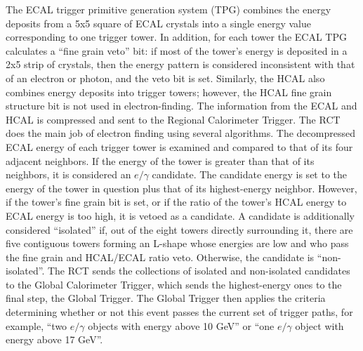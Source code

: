 The ECAL trigger primitive generation system (TPG) combines the energy deposits 
from a 5x5 square of ECAL crystals into a single energy value corresponding to 
one trigger tower. %
In addition, for each tower the ECAL TPG calculates a ``fine grain veto'' bit: 
if most of the tower's energy is deposited in a 2x5 strip of crystals, 
then the energy pattern is considered inconsistent with that of an electron
or photon, 
and the veto bit is set.  
Similarly, the HCAL also combines energy deposits into trigger towers; 
however, the HCAL fine grain structure bit is not used in electron-finding.  
The information from the ECAL and HCAL is compressed and sent to the 
Regional Calorimeter Trigger.  
The RCT does the main job of electron finding using several algorithms.  
The decompressed ECAL energy of each trigger tower is examined and 
compared to that of its four adjacent neighbors.  
If the energy of the tower is greater than that of its neighbors, 
it is considered an $e/\gamma$ candidate.  
The candidate energy is set to the energy of the tower in question 
plus that of its highest-energy neighbor.  
However, if the tower's fine grain bit is set, 
or if the ratio of the tower's HCAL energy to ECAL energy is too high, 
it is vetoed as a candidate.  
A candidate is additionally considered ``isolated'' if, 
out of the eight towers directly surrounding it, 
there are five contiguous towers forming an L-shape whose 
energies are low and who pass the fine grain and HCAL/ECAL ratio veto.  
Otherwise, the candidate is ``non-isolated''.  
The RCT sends the collections of isolated and non-isolated candidates to the 
Global Calorimeter Trigger, 
which sends the highest-energy ones to the final step, the Global Trigger.  
The Global Trigger then applies the criteria determining whether or not 
this event passes the current set of trigger paths,
for example, ``two $e/\gamma$ objects with energy above 10 GeV'' 
or ``one $e/\gamma$ object with energy above 17 GeV''.  




